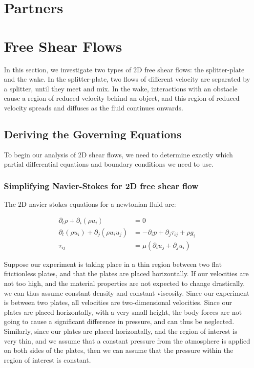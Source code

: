 \documentclass{article}
\begin{document}
\section{Partners}



\section{Free Shear Flows}

In this section, we investigate two types of 2D free shear flows:
	the splitter-plate and the wake.
In the splitter-plate, two flows of different velocity are separated by
	a splitter, until they meet and mix.
In the wake, interactions with an obstacle cause a region of reduced
	velocity behind an object, and this region of reduced
	velocity spreads and diffuses as the fluid continues onwards.

\subsection{Deriving the Governing Equations}

To begin our analysis of 2D shear flows, we need to determine exactly 
	which partial differential equations and boundary conditions
	we need to use.

\subsubsection{Simplifying Navier-Stokes for 2D free shear flow}

The 2D navier-stokes equations for a newtonian fluid are:

\begin{align}
\partial_t \rho + \partial_i \left( \rho u_i \right) & = 0 \\
\partial_t \left( \rho u_i \right) + \partial_j \left( \rho u_i u_j \right)
	& = - \partial_i p + \partial_j \tau_{ij} + \rho g_i\\
\tau_{ij} & = \mu \left( \partial_i u_j + \partial_j u_i \right)
\end{align}

Suppose our experiment is taking place in a thin region between two
	flat frictionless plates, and that the plates are placed horizontally.
If our velocities are not too high, and the material properties are not
	expected to change drastically, we can thus assume constant
	density and constant viscosity.
Since our experiment is between two plates, all velocities are two-dimensional
	velocities.
Since our plates are placed horizontally, with a very small height,
	the body forces are not going to cause a significant difference
	in pressure, and can thus be neglected.
Similarly, since our plates are placed horizontally, and the region
	of interest is very thin, and we assume that a constant pressure
	from the atmosphere is applied on both sides of the plates,
	then we can assume that the pressure within the region of 
	interest is constant.
\end{document}
